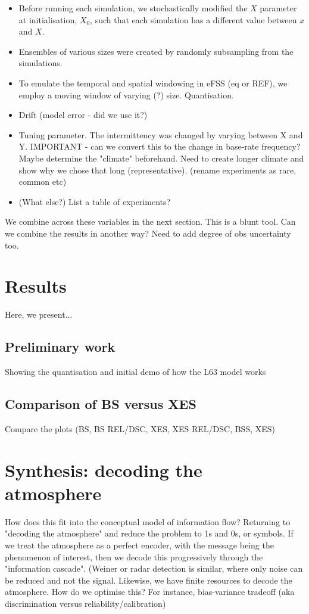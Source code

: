 \documentclass[draft]{ametsoc}
\begin{document}
\begin{itemize}
    \item Before running each simulation, we stochastically modified the $X$ parameter at initialisation, $X_0$, such that each simulation has a different value between $x$ and $X$. 
    \item Ensembles of various sizes were created by randomly subsampling from the simulations. 
    \item To emulate the temporal and spatial windowing in eFSS (eq or REF), we employ a moving window of varying (?) size. Quantisation.
    \item Drift (model error - did we use it?)
    \item Tuning parameter. The intermittency was changed by varying between X and Y. IMPORTANT - can we convert this to the change in base-rate frequency? Maybe determine the "climate" beforehand. Need to create longer climate and show why we chose that long (representative). (rename experiments as rare, common etc)
    \item (What else?) List a table of experiments?
\end{itemize}

We combine across these variables in the next section. This is a blunt tool. Can we combine the results in another way? Need to add degree of obs uncertainty too. 

\section{Results}
Here, we present...

\subsection{Preliminary work}
Showing the quantisation and initial demo of how the L63 model works

\subsection{Comparison of BS versus XES}
Compare the plots (BS, BS REL/DSC, XES, XES REL/DSC, BSS, XES)

\section{Synthesis: decoding the atmosphere}
How does this fit into the conceptual model of information flow? Returning to "decoding the atmosphere" and reduce the problem to 1s and 0s, or symbols. If we treat the atmosphere as a perfect encoder, with the message being the phenomenon of interest, then we decode this progressively through the "information cascade". (Weiner or radar detection is similar, where only noise can be reduced and not the signal. Likewise, we have finite resources to decode the atmosphere. How do we optimise this? For instance, bias-variance tradeoff (aka discrimination versus reliability/calibration)
\end{document}
